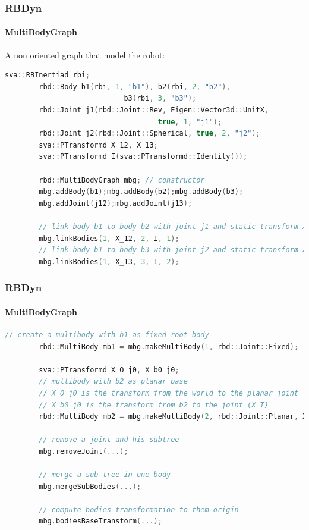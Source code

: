 \documentclass{beamer}
\begin{document}
	\begin{frame}[fragile]
	\frametitle{RBDyn}
	\framesubtitle{MultiBodyGraph}
	A non oriented graph that model the robot:
	\begin{lstlisting}[language=C++]
		sva::RBInertiad rbi;
		rbd::Body b1(rbi, 1, "b1"), b2(rbi, 2, "b2"),
							b3(rbi, 3, "b3");
		rbd::Joint j1(rbd::Joint::Rev, Eigen::Vector3d::UnitX,
									true, 1, "j1");
		rbd::Joint j2(rbd::Joint::Spherical, true, 2, "j2");
		sva::PTransformd X_12, X_13;
		sva::PTransformd I(sva::PTransformd::Identity());

		rbd::MultiBodyGraph mbg; // constructor
		mbg.addBody(b1);mbg.addBody(b2);mbg.addBody(b3);
		mbg.addJoint(j12);mbg.addJoint(j13);

		// link body b1 to body b2 with joint j1 and static transform X_12
		mbg.linkBodies(1, X_12, 2, I, 1);
		// link body b1 to body b3 with joint j2 and static transform X_13
		mbg.linkBodies(1, X_13, 3, I, 2);
	\end{lstlisting}
\end{frame}
	\begin{frame}[fragile]
	\frametitle{RBDyn}
	\framesubtitle{MultiBodyGraph}
	\begin{lstlisting}[language=C++]
		// create a multibody with b1 as fixed root body
		rbd::MultiBody mb1 = mbg.makeMultiBody(1, rbd::Joint::Fixed);

		sva::PTransformd X_O_j0, X_b0_j0;
		// multibody with b2 as planar base 
		// X_O_j0 is the transform from the world to the planar joint
		// X_b0_j0 is the transform from b2 to the joint (X_T)
		rbd::MultiBody mb2 = mbg.makeMultiBody(2, rbd::Joint::Planar, X_O_j0, X_b0_j0);

		// remove a joint and his subtree
		mbg.removeJoint(...);

		// merge a sub tree in one body
		mbg.mergeSubBodies(...);

		// compute bodies transformation to them origin
		mbg.bodiesBaseTransform(...);
	\end{lstlisting}
\end{frame}
\end{document}
